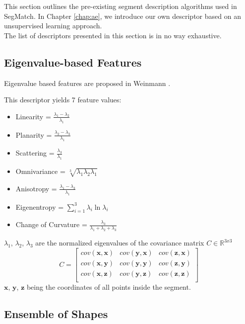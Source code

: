 This section outlines the pre-existing segment description algorithms used in SegMatch. In Chapter \ref{chap:ae}, we introduce our own descriptor based on an unsupervised learning approach.\\

The list of descriptors presented in this section is in no way exhaustive.\\

\subsection{Eigenvalue-based Features}
\label{subsec:eigenvalues}

Eigenvalue based features are proposed in Weinmann \cite{weinmann2014semantic}.

This descriptor yields 7 feature values:

\begin{itemize}
  \item{Linearity = $\frac{\lambda_1 - \lambda_2}{\lambda_1}$}
  \item{Planarity = $\frac{\lambda_2 - \lambda_3}{\lambda_1}$}
  \item{Scattering = $\frac{\lambda_3}{\lambda_1}$}
  \item{Omnivariance = $\sqrt[3]{\lambda_1 \lambda_2 \lambda_1}$}
  \item{Anisotropy = $\frac{\lambda_1 - \lambda_3}{\lambda_1}$}
  \item{Eigenentropy = $\sum\limits_{i=1}^3 \lambda_i \ln{\lambda_i}$}
  \item{Change of Curvature = $\frac{\lambda_3}{\lambda_1 + \lambda_2 + \lambda_3}$}
\end{itemize}

$\lambda_1$, $\lambda_2$, $\lambda_3$ are the normalized eigenvalues of the covariance matrix $C \in \mathbb{R}^{3x3}$
$$
C = 
\begin{bmatrix}
  cov(\textbf{x},\textbf{x}) & cov(\textbf{y},\textbf{x}) & cov(\textbf{z},\textbf{x})  \\
  cov(\textbf{x},\textbf{y}) & cov(\textbf{y},\textbf{y}) & cov(\textbf{z},\textbf{y})  \\
  cov(\textbf{x},\textbf{z}) & cov(\textbf{y},\textbf{z}) & cov(\textbf{z},\textbf{z})  \\
\end{bmatrix} 
$$
$\textbf{x}$, $\textbf{y}$, $\textbf{z}$ being the coordinates of all points inside the segment.

\subsection{Ensemble of Shapes}
\label{subsec:ensemble-of-shapes}

